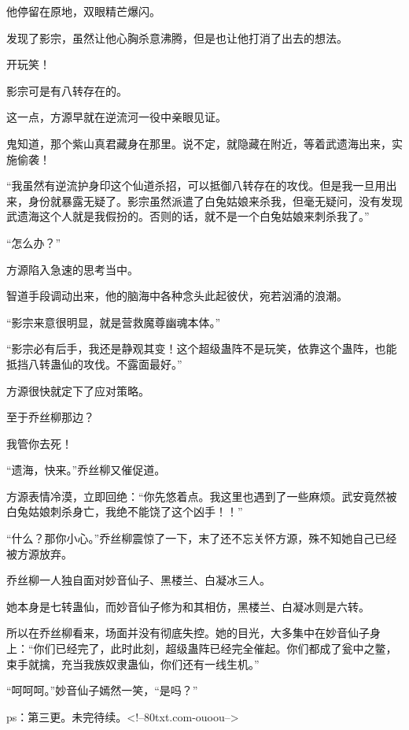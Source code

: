\begin{this_body}
他停留在原地，双眼精芒爆闪。

发现了影宗，虽然让他心胸杀意沸腾，但是也让他打消了出去的想法。

开玩笑！

影宗可是有八转存在的。

这一点，方源早就在逆流河一役中亲眼见证。

鬼知道，那个紫山真君藏身在那里。说不定，就隐藏在附近，等着武遗海出来，实施偷袭！

“我虽然有逆流护身印这个仙道杀招，可以抵御八转存在的攻伐。但是我一旦用出来，身份就暴露无疑了。影宗虽然派遣了白兔姑娘来杀我，但毫无疑问，没有发现武遗海这个人就是我假扮的。否则的话，就不是一个白兔姑娘来刺杀我了。”

“怎么办？”

方源陷入急速的思考当中。

智道手段调动出来，他的脑海中各种念头此起彼伏，宛若汹涌的浪潮。

“影宗来意很明显，就是营救魔尊幽魂本体。”

“影宗必有后手，我还是静观其变！这个超级蛊阵不是玩笑，依靠这个蛊阵，也能抵挡八转蛊仙的攻伐。不露面最好。”

方源很快就定下了应对策略。

至于乔丝柳那边？

我管你去死！

“遗海，快来。”乔丝柳又催促道。

方源表情冷漠，立即回绝：“你先悠着点。我这里也遇到了一些麻烦。武安竟然被白兔姑娘刺杀身亡，我绝不能饶了这个凶手！！”

“什么？那你小心。”乔丝柳震惊了一下，末了还不忘关怀方源，殊不知她自己已经被方源放弃。

乔丝柳一人独自面对妙音仙子、黑楼兰、白凝冰三人。

她本身是七转蛊仙，而妙音仙子修为和其相仿，黑楼兰、白凝冰则是六转。

所以在乔丝柳看来，场面并没有彻底失控。她的目光，大多集中在妙音仙子身上：“你们已经完了，此时此刻，超级蛊阵已经完全催起。你们都成了瓮中之鳖，束手就擒，充当我族奴隶蛊仙，你们还有一线生机。”

“呵呵呵。”妙音仙子嫣然一笑，“是吗？”

ps：第三更。未完待续。<!--80txt.com-ouoou-->

\end{this_body}

